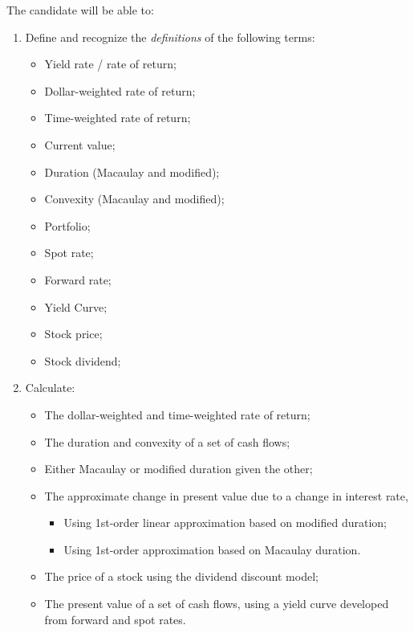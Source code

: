 \begin{outcomes}
The candidate will be able to:
\begin{enumerate}[label = \alph*)]
	\item	Define and recognize the \textit{definitions} of the following terms:
		\begin{multicols*}{2}
		\begin{itemize}[leftmargin = *]
		\item	Yield rate / rate of return;
		\item	Dollar-weighted rate of return;
		\item	Time-weighted rate of return;
		\item	Current value;
		\item	Duration	 (Macaulay and modified);
		\item	Convexity (Macaulay and modified);
		\item	Portfolio;
		\item	Spot rate;
		\item	Forward rate;
		\item	Yield Curve;
		\item	Stock price;
		\item	Stock dividend;
		\end{itemize}
		\end{multicols*}
	\item	Calculate:
		\begin{itemize}
		\item	The dollar-weighted and time-weighted rate of return;
		\item 	The duration and convexity of a set of cash flows;
		\item	Either Macaulay or modified duration given the other;
		\item	The approximate change in present value due to a change in interest rate,
			\begin{itemize}
			\item	Using 1st-order linear approximation based on modified duration;
			\item	Using 1st-order approximation based on Macaulay duration.
			\end{itemize}
		\item	The price of a stock using the dividend discount model;
		\item	The present value of a set of cash flows, using a yield curve developed from forward and spot rates.
		\end{itemize}
\end{enumerate}
\end{outcomes}

